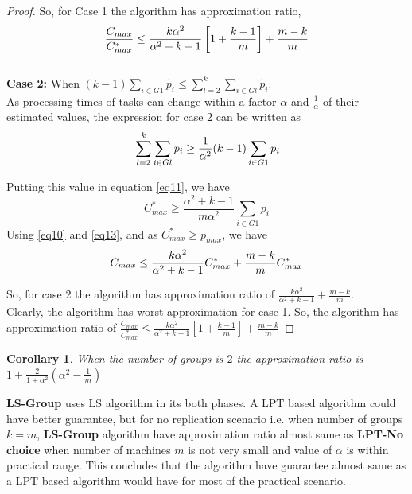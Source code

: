 \documentclass[10pt, conference, compsocconf]{IEEEtran}
\newtheorem{corollary}{Corollary}[theorem]
\begin{document}
\begin{proof}
 So, for Case 1 the algorithm has approximation ratio,
 \begin{equation}{\nonumber}
\frac{C_{max}}{C_{max}^{*}} \leq \frac{k\alpha^{2}}{\alpha^{2}+k-1}\left[1+ {\frac{k-1}{m}} \right]+ {\frac{m-k}{m}} \end{equation}\\

\textbf{Case 2:} When $(k-1)\sum_{i \in G1 }^{}{\tilde p_{i}} \leq \sum_{l=2}^{k}\sum_{i \in Gl }^{}{\tilde p_{i}}$. \\

As processing times of tasks  can change within a factor $\alpha$ and $\frac{1}{\alpha}$ of their estimated values, the expression for case 2 can be written as 
\begin{equation}{\nonumber}
\sum_{l=2}^{k}\sum_{i \in Gl }^{}{ p_{i}} \geq \frac{1}{\alpha^2} (k-1)\sum_{i \in G1 }^{}{ p_{i}}
\end{equation}

Putting this value in equation \ref{eq11}, we have
\begin{equation}\label{eq13}
 C_{max}^{*} \geq \frac{\alpha^2+k-1}{m\alpha^2}\sum_{i \in G1 }^{}{ p_{i}}
\end{equation}
Using \ref{eq10} and \ref{eq13}, and as $C_{max}^{*} \geq p_{max}$, we have
\begin{equation}{\nonumber}
 C_{max} \leq \frac{k\alpha^2}{\alpha^2+k-1}C_{max}^{*}+\frac{m-k}{m}C_{max}^{*}
\end{equation}

So, for case 2 the algorithm has approximation ratio of $\frac{k\alpha^2}{\alpha^2+k-1}+\frac{m-k}{m}$.\\
Clearly, the algorithm has worst approximation for case 1.  So, the algorithm has approximation ratio of $\frac{C_{max}}{C_{max}^{*}} \leq \frac{k\alpha^{2}}{\alpha^{2}+k-1}\left[1+ {\frac{k-1}{m}} \right]+ {\frac{m-k}{m}}$



 
\end{proof}

\begin{corollary}
 When the number of groups is $2$ the approximation ratio is $ 1+ \frac{2}{1+\alpha^{2}} (\alpha^2-\frac{1}{m})  $ 
\end{corollary}

 \textbf{LS-Group} uses LS algorithm in its both phases. A LPT based algorithm could have better guarantee, but for no replication scenario i.e. when number of groups $k=m$, \textbf{LS-Group} algorithm have approximation ratio almost same as \textbf{LPT-No choice} when number of machines $m$ is not very small and value of $\alpha$ is within practical range. This concludes that the algorithm have guarantee almost same as a LPT based algorithm would have for most of the practical scenario.
\end{document}
